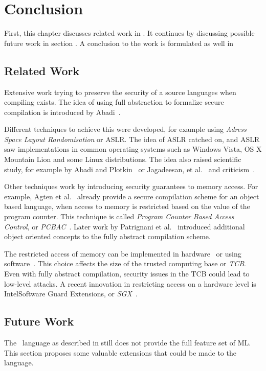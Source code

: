 \chapter{Conclusion}
\label{chap:conclusion}
First, this chapter discusses related work in .
It continues by discussing possible future work in section .
A conclusion to the work is formulated as well in 

\section{Related Work}
\label{sec:relatedwork}
Extensive work trying to preserve the security of a source languages when compiling exists.
The idea of using full abstraction to formalize secure compilation is introduced by Abadi~\cite{Abadi}.

Different techniques to achieve this were developed, for example using \emph{Adress Space Layout Randomisation} or ASLR.
The idea of ASLR catched on, and ASLR saw implementations in common operating systems such as Windows Vista, OS X Mountain Lion and some Linux distributions. 
The idea also raised scientific study, for example by Abadi and Plotkin~\cite{AbadiASLR} or Jagadeesan, et al.~\cite{Jagadeesan} and criticism~\cite{Shacham:2004:EAR:1030083.1030124,Strackx:2009:BMS:1519144.1519145}.

Other techniques work by introducing security guarantees to memory access.
For example, Agten et al.~\cite{Agten:2012:SCM:2354412.2355247} already provide a secure compilation scheme for an object based language, when access to memory is restricted based on the value of the program counter. This technique is called \emph{Program Counter Based Access Control}, or \emph{PCBAC}~\cite{PCBAC}.
Later work by Patrignani et al.~\cite{Patrignani} introduced additional object oriented concepts to the fully abstract compilation scheme.

The restricted access of memory can be implemented in hardware~\cite{Sancus,SGX} or using software~\cite{Fides,Salus}.
This choice affects the size of the trusted computing base or \emph{TCB}.
Even with fully abstract compilation, security issues in the TCB could lead to low-level attacks.
A recent innovation in restricting access on a hardware level is Intel\textregistered Software Guard Extensions, or \emph{SGX}~\cite{SGX}.

\section{Future Work}
\label{sec:FutureWork}
The \MiniML\ language as described in  still does not provide the full feature set of ML. This section proposes some valuable extensions that could be made to the language.


